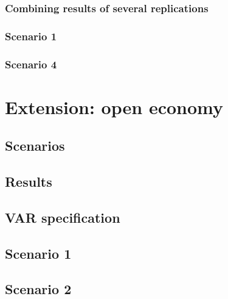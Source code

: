                 \subsubsection{Combining results of several replications}
                    \lipsum[1]
                \subsubsection{Scenario 1}
                    \lipsum[1]
                        \lipsum[1]
                \subsubsection{Scenario 4}
                    \lipsum[1]
                        \lipsum[1]
        \section{Extension: open economy}
            \lipsum[1]
            \subsection{Scenarios}
                \lipsum[1]
            \subsection{Results}
                \lipsum[1]
                \subsection{VAR specification}
                    \lipsum[1]
                \subsection{Scenario 1}
                    \lipsum[1]
                        \lipsum[1]
                \subsection{Scenario 2}
                    \lipsum[1]
                        \lipsum[1]
    \printbibliography
 